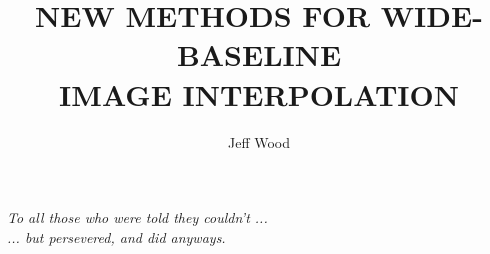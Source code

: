 \documentclass[12pt]{report}
\begin{document}
    
       \author{Jeff Wood}
       \title{NEW METHODS FOR WIDE-BASELINE \\ IMAGE INTERPOLATION}



          \titlepage


         \copyrightpage

\newpage
\thispagestyle{empty}

	\vspace*{1.0in}
	\begin{center}
		\textit{To all those who were told they couldn't ...
\\
		... but persevered, and did anyways.}
	\end{center}

\newpage

\end{document}
